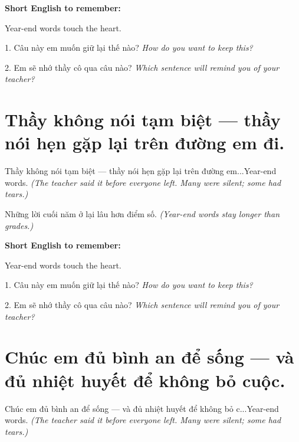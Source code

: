 \begin{ghinhoanh}
\textbf{Short English to remember:}

Year-end words touch the heart.

\end{ghinhoanh}

\begin{tuhocnhanh}
1. Câu này em muốn giữ lại thế nào? \textit{How do you want to keep this?}

2. Em sẽ nhớ thầy cô qua câu nào? \textit{Which sentence will remind you of your teacher?}
\end{tuhocnhanh}
\ngancach


\section{Thầy không nói tạm biệt — thầy nói hẹn gặp lại trên đường em đi.}
\begin{truyen}{Thầy không nói tạm biệt — thầy nói hẹn gặp lại trên đường em...}{Year-end words.}
\textit{(The teacher said it before everyone left. Many were silent; some had tears.)}
\end{truyen}

\begin{baihoc}
Những lời cuối năm ở lại lâu hơn điểm số.
\textit{(Year-end words stay longer than grades.)}
\end{baihoc}

\begin{ghinhoanh}
\textbf{Short English to remember:}

Year-end words touch the heart.

\end{ghinhoanh}

\begin{tuhocnhanh}
1. Câu này em muốn giữ lại thế nào? \textit{How do you want to keep this?}

2. Em sẽ nhớ thầy cô qua câu nào? \textit{Which sentence will remind you of your teacher?}
\end{tuhocnhanh}
\ngancach


\section{Chúc em đủ bình an để sống — và đủ nhiệt huyết để không bỏ cuộc.}
\begin{truyen}{Chúc em đủ bình an để sống — và đủ nhiệt huyết để không bỏ c...}{Year-end words.}
\textit{(The teacher said it before everyone left. Many were silent; some had tears.)}
\end{truyen}

